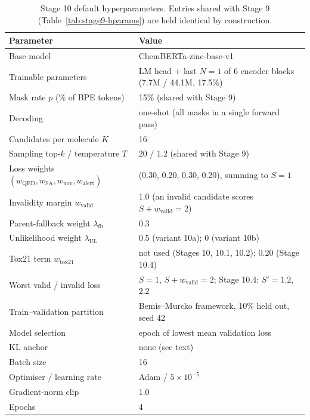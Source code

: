 \begin{table}[htbp]
\centering
\caption{Stage 10 default hyperparameters. Entries shared with Stage 9
(Table~\ref{tab:stage9-hparams}) are held identical by construction.}
\label{tab:stage10-hparams}
\begin{tabular}{@{}ll@{}}
\toprule
Parameter & Value \\
\midrule
Base model & ChemBERTa-zinc-base-v1~\cite{chithrananda2020chemberta} \\
Trainable parameters & LM head $+$ last $N=1$ of 6 encoder blocks (7.7M / 44.1M, 17.5\%) \\
Mask rate $p$ (\% of BPE tokens) & 15\% (shared with Stage 9) \\
Decoding & one-shot (all masks in a single forward pass) \\
Candidates per molecule $K$ & 16 \\
Sampling top-$k$ / temperature $T$ & 20 / 1.2 (shared with Stage 9) \\
Loss weights $(w_{\mathrm{QED}}, w_{\mathrm{SA}}, w_{\mathrm{nov}}, w_{\mathrm{alert}})$ & (0.30, 0.20, 0.30, 0.20), summing to $S=1$ \\
Invalidity margin $w_{\mathrm{valid}}$ & 1.0 (an invalid candidate scores $S+w_{\mathrm{valid}}=2$) \\
Parent-fallback weight $\lambda_{\mathrm{fb}}$ & 0.3 \\
Unlikelihood weight $\lambda_{\mathrm{UL}}$ & 0.5 (variant 10a); 0 (variant 10b) \\
Tox21 term $w_{\mathrm{tox21}}$ & not used (Stages 10, 10.1, 10.2); $0.20$ (Stage 10.4) \\
Worst valid / invalid loss & $S=1$, $S+w_{\mathrm{valid}}=2$; Stage 10.4: $S'=1.2$, $2.2$ \\
Train--validation partition & Bemis--Murcko framework, 10\% held out, seed 42 \\
Model selection & epoch of lowest mean validation loss \\
KL anchor & none (see text) \\
Batch size & 16 \\
Optimiser / learning rate & Adam / $5\times10^{-5}$ \\
Gradient-norm clip & 1.0 \\
Epochs & 4 \\
\bottomrule
\end{tabular}
\end{table}
